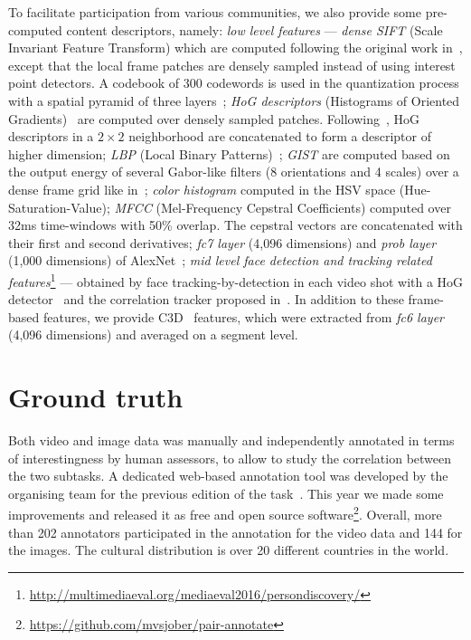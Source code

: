 \documentclass[sigconf]{acmart-me}
\begin{document}
To facilitate participation from various communities, we also
provide some pre-computed content descriptors, namely: \emph{low
level features} --- \emph{dense SIFT} (Scale Invariant Feature
Transform) which are computed following the original work
in~\cite{Lowe2004}, except that the local frame patches are densely
sampled instead of using interest point detectors. A codebook of 300
codewords is used in the quantization process with a spatial pyramid
of three layers~\cite{Lazebnik2006}; \emph{HoG descriptors}
(Histograms of Oriented Gradients)~\cite{Dalal2005} are computed
over densely sampled patches. Following~\cite{Xiao2010}, HoG
descriptors in a $2\times2$ neighborhood are concatenated to form a
descriptor of higher dimension; \emph{LBP} (Local Binary
Patterns)~\cite{Ojala2002}; \emph{GIST} are computed based on the
output energy of several Gabor-like filters (8 orientations and 4
scales) over a dense frame grid like in~\cite{Oliva2001};
\emph{color histogram} computed in the HSV space
(Hue-Saturation-Value); \emph{MFCC} (Mel-Frequency Cepstral
Coefficients) computed over 32ms time-windows with 50\%
overlap. The cepstral vectors are concatenated with their first and
second derivatives; \emph{fc7 layer} (4,096 dimensions) and
\emph{prob layer} (1,000 dimensions) of AlexNet~\cite{Jiang2015};
\emph{mid level face detection and tracking related
features}\footnote{\url{http://multimediaeval.org/mediaeval2016/persondiscovery/}}
--- obtained by face tracking-by-detection in each video shot with a
HoG detector~\cite{Dalal2005} and the correlation tracker proposed
in~\cite{Danelljan2014}. In addition to these frame-based features, we provide C3D~\cite{tran2015learning} features, which were extracted from \emph{fc6 layer} (4,096 dimensions) and averaged on a segment level.


\vspace{-0.2cm}
\section{Ground truth}

Both video and image data was manually and independently annotated in terms of interestingness by human assessors, to allow to study the correlation between the two subtasks.
A dedicated web-based annotation tool was developed by the organising team for the previous edition of the task~\cite{demarty2016mediaeval}. 
This year we made some improvements and released it as free and open source software\footnote{\url{https://github.com/mvsjober/pair-annotate}}.
Overall, more than 202 annotators participated in the annotation for the video data and 144 for the images.
The cultural distribution is over 20 different countries in the world.
\end{document}
